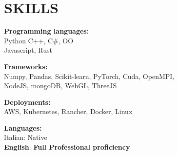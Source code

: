 \documentclass[letterpaper,10pt]{article}
\begin{document}
%
\section{SKILLS}

\begin{minipage}[ht]{0.48\textwidth}
\textbf{Programming languages:} \\
Python C++, C\#, OO \\ Javascript, Rust
\vspace{1em}

\textbf{Frameworks:} \\
Numpy, Pandas, Scikit-learn, PyTorch, Cuda, OpenMPI, \\ 
NodeJS, mongoDB, WebGL, ThreeJS

\end{minipage}
\begin{minipage}[ht]{0.48\textwidth}
\textbf{Deployments:} \\
AWS, Kubernetes, Rancher, Docker, Linux

\vspace{1em}
\textbf{Languages:} \\
Italian: Native \\
{\bf English}: {\bf Full Professional proficiency}\\

\end{minipage}


\end{document}
